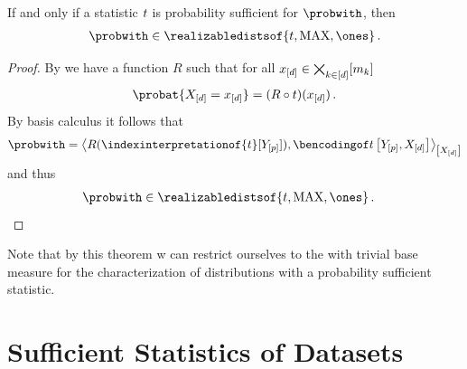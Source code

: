 \documentclass[aps,onecolumn,nofootinbib,pra]{article}
\begin{document}
    \begin{theorem}
        If and only if a statistic $t$ is probability sufficient for $\probwith$, then
        \begin{align*}
            \probwith \in \realizabledistsof{\sstat,\maxgraph,\trivbm} \, .
        \end{align*}
    \end{theorem}
    \begin{proof}
        By  we have a function $R$ such that for all $x_{[d]}\in\bigtimes_{k\in[d]}[m_{k}]$
        \begin{align*}
            \probat{\indexedshortcatvariables} = (R \circ \sstat)(\shortcatindices) \, .
        \end{align*}
        By basis calculus it follows that
        \begin{align*}
            \probwith = \contractionof{R(\indexinterpretationof{\sstat}[\headvariables]),\bencsstatwith}{\shortcatvariables}
        \end{align*}
        and thus
        \begin{align*}
            \probwith \in \realizabledistsof{\sstat,\maxgraph,\trivbm} \, . & \qedhere
        \end{align*}
    \end{proof}

    Note that by this theorem w can restrict ourselves to the \ComputationActivationNetworks{} with trivial base measure for the characterization of distributions with a probability sufficient statistic.




    \section{Sufficient Statistics of Datasets}
\end{document}
